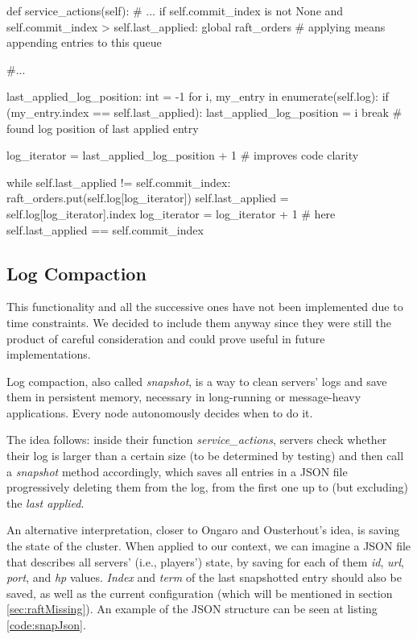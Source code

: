 \begin{python}[label={code:applyToState}, caption={All nodes apply entries to state based on \textit{commit\_index}}]
def service_actions(self):
        # ...
        if self.commit_index is not None and self.commit_index > self.last_applied:   
            global raft_orders  # applying means appending entries to this queue

            #...

            last_applied_log_position: int = -1 
            for i, my_entry in enumerate(self.log):
                if (my_entry.index == self.last_applied):
                    last_applied_log_position = i
                    break # found log position of last applied entry 
            
            log_iterator = last_applied_log_position + 1    # improves code clarity 

            while self.last_applied != self.commit_index:
                raft_orders.put(self.log[log_iterator])
                self.last_applied = self.log[log_iterator].index
                log_iterator = log_iterator + 1
            # here self.last_applied == self.commit_index
\end{python}

\subsection{Log Compaction}

This functionality and all the successive ones have not been implemented due to time constraints. We decided to include them anyway since they were still the product of careful consideration and could prove useful in future implementations.

Log compaction, also called \textit{snapshot}, is a way to clean servers' logs and save them in persistent memory, necessary in long-running or message-heavy applications. Every node autonomously decides when to do it.

The idea follows: inside their function \textit{service\_actions}, servers check whether their log is larger than a certain size (to be determined by testing) and then call a \textit{snapshot} method accordingly, which saves all entries in a JSON file progressively deleting them from the log, from the first one up to (but excluding) the \textit{last applied}.

An alternative interpretation, closer to Ongaro and Ousterhout's idea, is saving the state of the cluster. When applied to our context, we can imagine a JSON file that describes all servers' (i.e., players') state, by saving for each of them \textit{id}, \textit{url}, \textit{port}, and \textit{hp} values. \textit{Index} and \textit{term} of the last snapshotted entry should also be saved, as well as the current configuration (which will be mentioned in section \ref{sec:raftMissing}). An example of the JSON structure can be seen at listing \ref{code:snapJson}. 

